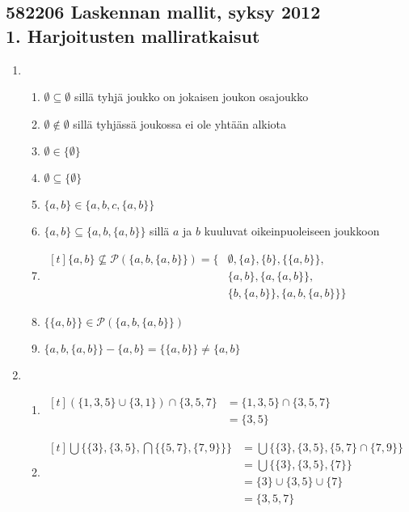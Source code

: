 \documentclass[a4paper,11pt,draft]{article}
\newenvironment{lalign}%
{\begin{math}\begin{aligned}[t]}%
{\end{aligned}\end{math}}
\begin{document}
\subsection*{582206 Laskennan mallit, syksy 2012\\
1. Harjoitusten malliratkaisut}

\begin{enumerate}
\item
  \begin{enumerate}
  \item $\emptyset \subseteq \emptyset$ sillä tyhjä joukko on jokaisen
    joukon osajoukko
  \item $\emptyset \notin \emptyset$ sillä tyhjässä joukossa ei ole
    yhtään alkiota
  \item $\emptyset \in \{\emptyset\}$
  \item $\emptyset \subseteq \{\emptyset\}$
  \item $\{a,b\} \in \{a,b,c,\{a,b\}\}$
  \item $\{a,b\} \subseteq \{a,b,\{a,b\}\}$ sillä $a$ ja $b$ kuuluvat
    oikeinpuoleiseen joukkoon

  \item
    \begin{lalign}
      \{a,b\} \not\subseteq \mathcal{P}(\{a,b,\{a,b\}\}) =
      \{&\emptyset, \{a\}, \{b\}, \{\{a,b\}\},\\
        &\{a, b\}, \{a, \{a, b\}\},\\
        &\{b, \{a, b\}\}, \{a, b, \{a, b\}\}\}
    \end{lalign}

  \item $\{\{a,b\}\} \in \mathcal{P}(\{a,b,\{a,b\}\})$
  \item $\{a,b,\{a,b\}\} - \{a,b\}= \{\{a,b\}\} \neq \{a, b\}$
  \end{enumerate}

\item
  \begin{enumerate}
  \item
    \begin{lalign}
      (\{1,3,5\} \cup \{3,1\}) \cap \{3,5,7\}
      &= \{1,3,5\} \cap \{3,5,7\} \\
      &= \{3,5\}
    \end{lalign}

  \item
    \begin{lalign}
      \bigcup\{\{3\},\{3,5\},\bigcap\{\{5,7\},\{7,9\}\}\}
      &= \bigcup\{\{3\},\{3,5\},\{5,7\} \cap \{7,9\}\} \\
      &= \bigcup\{\{3\},\{3,5\},\{7\}\} \\
      &= \{3\} \cup \{3,5\} \cup \{7\} \\
      &= \{3,5,7\}
    \end{lalign}


\end{enumerate}
\end{enumerate}
\end{document}
